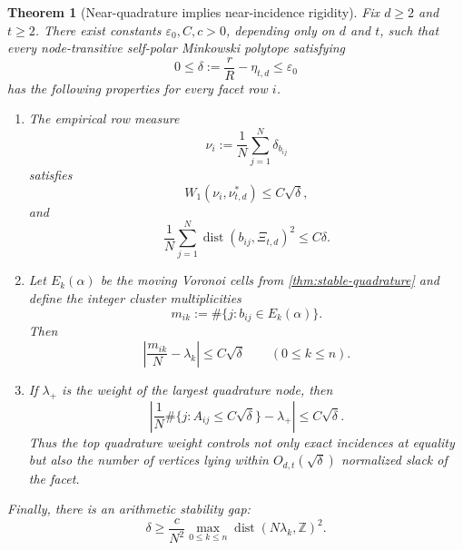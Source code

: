 \documentclass[11pt]{amsart}
\newtheorem{theorem}{Theorem}[section]
\theoremstyle{definition}
\theoremstyle{remark}
\begin{document}
\begin{theorem}[Near-quadrature implies near-incidence rigidity]\label{thm:near-incidence}
Fix $d\ge2$ and $t\ge2$.  There exist constants $\varepsilon_0,C,c>0$, depending only on $d$ and $t$, such that every node-transitive self-polar Minkowski polytope satisfying
\[
 0\le\delta:=\frac rR-\eta_{t,d}\le\varepsilon_0
\]
has the following properties for every facet row $i$.

\begin{enumerate}[label=\textup{(\roman*)}]
\item The empirical row measure
\[
 \nu_i:=\frac1N\sum_{j=1}^N\delta_{b_{ij}}
\]
satisfies
\begin{equation}\label{eq:row-W1}
 W_1(\nu_i,\nu_{t,d}^*)\le C\sqrt\delta,
\end{equation}
and
\begin{equation}\label{eq:row-cluster}
 \frac1N\sum_{j=1}^N\operatorname{dist}(b_{ij},\Xi_{t,d})^2\le C\delta.
\end{equation}

\item Let $E_k(\alpha)$ be the moving Voronoi cells from \cref{thm:stable-quadrature} and define the integer cluster multiplicities
\[
 m_{ik}:=\#\{j:b_{ij}\in E_k(\alpha)\}.
\]
Then
\begin{equation}\label{eq:cluster-multiplicity}
 \boxed{
 \left|\frac{m_{ik}}N-\lambda_k\right|\le C\sqrt\delta
 \qquad(0\le k\le n).}
\end{equation}

\item If $\lambda_+$ is the weight of the largest quadrature node, then
\begin{equation}\label{eq:near-incidence-count}
 \boxed{
 \left|
 \frac1N\#\{j:A_{ij}\le C\sqrt\delta\}-\lambda_+
 \right|\le C\sqrt\delta.}
\end{equation}
Thus the top quadrature weight controls not only exact incidences at equality but also the number of vertices lying within $O_{d,t}(\sqrt\delta)$ normalized slack of the facet.
\end{enumerate}

Finally, there is an arithmetic stability gap:
\begin{equation}\label{eq:arithmetic-gap}
 \boxed{
 \delta\ge
 \frac{c}{N^2}
 \max_{0\le k\le n}
 \operatorname{dist}(N\lambda_k,\mathbb Z)^2.}
\end{equation}
\end{theorem}
\end{document}
